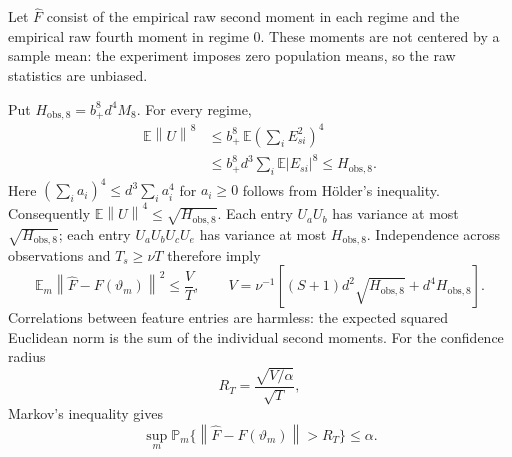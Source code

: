 \documentclass[11pt,a4paper]{article}
\numberwithin{equation}{section}
\newcommand{\E}{\mathbb E}
\newcommand{\Prob}{\mathbb P}
\newcommand{\norm}[1]{\left\lVert #1\right\rVert}
\begin{document}
Let \(\widehat F\) consist of the empirical raw second moment in each
regime and the empirical raw fourth moment in regime \(0\).
These moments are not centered by a sample mean: the experiment imposes
zero population means, so the raw statistics are unbiased.

Put \(H_{\mathrm{obs},8}=b_+^8d^4M_8\). For every regime,
\begin{align*}
 \E\norm{U}^8
 &\le b_+^8\,\E\left(\sum_i E_{si}^2\right)^4\\
 &\le b_+^8d^3\sum_i\E|E_{si}|^8
 \le H_{\mathrm{obs},8}.
\end{align*}
Here \((\sum_i a_i)^4\le d^3\sum_i a_i^4\) for \(a_i\ge0\)
follows from H\"older's inequality.
Consequently \(\E\norm U^4\le\sqrt{H_{\mathrm{obs},8}}\).
Each entry \(U_aU_b\) has variance at most \(\sqrt{H_{\mathrm{obs},8}}\);
each entry \(U_aU_bU_cU_e\) has variance at most \(H_{\mathrm{obs},8}\).
Independence across observations and \(T_s\ge\nu T\) therefore imply
\begin{equation}\label{eq:concentration}
 \E_m\norm{\widehat F-F(\vartheta_m)}^2\le\frac VT,\qquad
 V=\nu^{-1}\left[(S+1)d^2\sqrt{H_{\mathrm{obs},8}}
                      +d^4H_{\mathrm{obs},8}\right].
\end{equation}
Correlations between feature entries are harmless: the expected squared
Euclidean norm is the sum of the individual second moments.
For the confidence radius
\begin{equation}\label{eq:radius}
 R_T=\frac{\sqrt{V/\alpha}}{\sqrt T},
\end{equation}
Markov's inequality gives
\begin{equation}\label{eq:coverageevent}
 \sup_m\Prob_m\{\norm{\widehat F-F(\vartheta_m)}>R_T\}\le\alpha.
\end{equation}
\end{document}
